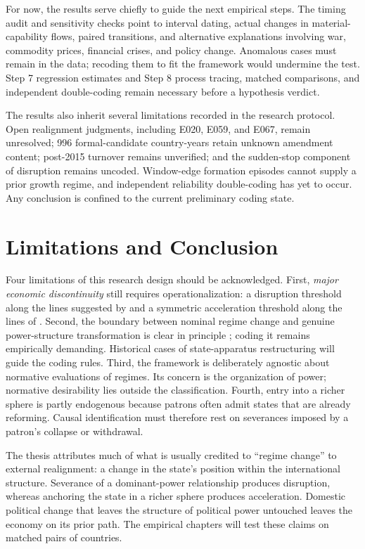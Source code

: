 \documentclass[11pt]{article}
\begin{document}
For now, the results serve chiefly to guide the next empirical steps. The timing audit and sensitivity checks point to interval dating, actual changes in material-capability flows, paired transitions, and alternative explanations involving war, commodity prices, financial crises, and policy change. Anomalous cases must remain in the data; recoding them to fit the framework would undermine the test. Step 7 regression estimates and Step 8 process tracing, matched comparisons, and independent double-coding remain necessary before a hypothesis verdict.

The results also inherit several limitations recorded in the research protocol. Open realignment judgments, including E020, E059, and E067, remain unresolved; 996 formal-candidate country-years retain unknown amendment content; post-2015 turnover remains unverified; and the sudden-stop component of disruption remains uncoded. Window-edge formation episodes cannot supply a prior growth regime, and independent reliability double-coding has yet to occur. Any conclusion is confined to the current preliminary coding state.

\section{Limitations and Conclusion}
\label{sec:discussion}

Four limitations of this research design should be acknowledged. First, \emph{major economic discontinuity} still requires operationalization: a disruption threshold along the lines suggested by \textcite{rodrik_1999} and a symmetric acceleration threshold along the lines of \textcite{hausmann_pritchett_rodrik_2005}. Second, the boundary between nominal regime change and genuine power-structure transformation is clear in principle \parencite{garciatrevijano2010,linz_stepan_1996}; coding it remains empirically demanding. Historical cases of state-apparatus restructuring \parencite{skocpol_1979} will guide the coding rules. Third, the framework is deliberately agnostic about normative evaluations of regimes. Its concern is the organization of power; normative desirability lies outside the classification. Fourth, entry into a richer sphere is partly endogenous because patrons often admit states that are already reforming. Causal identification must therefore rest on severances imposed by a patron's collapse or withdrawal.

The thesis attributes much of what is usually credited to ``regime change'' to external realignment: a change in the state's position within the international structure. Severance of a dominant-power relationship produces disruption, whereas anchoring the state in a richer sphere produces acceleration. Domestic political change that leaves the structure of political power untouched leaves the economy on its prior path. The empirical chapters will test these claims on matched pairs of countries.

\printbibliography
\end{document}
